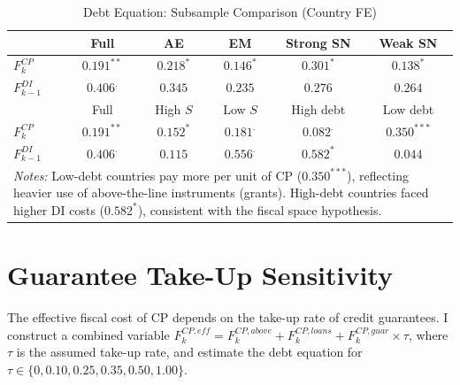 \documentclass[12pt, a4paper]{article}
\begin{document}
\begin{table}[htbp]
\centering
\caption{Debt Equation: Subsample Comparison (Country FE)}
\label{tab:sub_debt}
\small
\begin{tabular}{lccccc}
\toprule
 & Full & AE & EM & Strong SN & Weak SN \\
\midrule
$F_k^{CP}$
  & $0.191^{**}$ & $0.218^{*}$ & $0.146^{*}$ & $0.301^{*}$ & $0.138^{*}$ \\
$F_{k-1}^{DI}$
  & $0.406^{.}$ & $0.345$ & $0.235$ & $0.276$ & $0.264$ \\
\midrule
 & Full & High $S$ & Low $S$ & High debt & Low debt \\
\midrule
$F_k^{CP}$
  & $0.191^{**}$ & $0.152^{*}$ & $0.181^{.}$ & $0.082^{.}$ & $0.350^{***}$ \\
$F_{k-1}^{DI}$
  & $0.406^{.}$ & $0.115$ & $0.556^{.}$ & $0.582^{*}$ & $0.044$ \\
\bottomrule
\multicolumn{6}{p{13cm}}{\footnotesize \textit{Notes:} Low-debt countries pay more per unit of CP ($0.350^{***}$), reflecting heavier use of above-the-line instruments (grants). High-debt countries faced higher DI costs ($0.582^{*}$), consistent with the fiscal space hypothesis.} \\
\end{tabular}
\end{table}


\section{Guarantee Take-Up Sensitivity}
\label{app:takeup}

The effective fiscal cost of CP depends on the take-up rate of credit guarantees. I construct a combined variable $F_k^{CP,eff} = F_k^{CP,above} + F_k^{CP,loans} + F_k^{CP,guar} \times \tau$, where $\tau$ is the assumed take-up rate, and estimate the debt equation for $\tau \in \{0, 0.10, 0.25, 0.35, 0.50, 1.00\}$.
\end{document}
